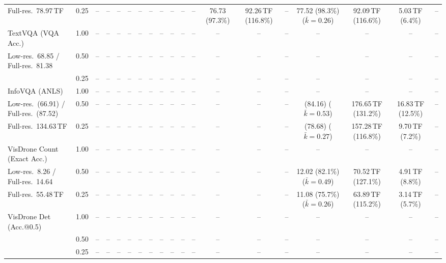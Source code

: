 \begin{table}[t]
{\begin{tabular}{l c | c c c c | c c c c | c c | c c c | c c c c}
{\footnotesize Full-res.\ 78.97\,TF} & 0.25 & -- & -- & -- & -- & -- & -- & -- & -- & -- & -- & 76.73 (97.3\%) & 92.26\,TF (116.8\%) & -- & \cellcolor{gray!15}77.52 (98.3\%) {\footnotesize ($\bar k{=}0.26$)} & 92.09\,TF (116.6\%) & 5.03\,TF (6.4\%) & -- \\
\cmidrule(lr){1-19}
TextVQA (VQA Acc.) & 1.00 & -- & -- & -- & -- & -- & -- & -- & -- & -- & -- & -- & -- & -- & -- & -- & -- & -- \\
{\footnotesize Low-res.\ 68.85 / Full-res.\ 81.38} & 0.50 & -- & -- & -- & -- & -- & -- & -- & -- & -- & -- & -- & -- & -- & -- & -- & -- & -- \\
 & 0.25 & -- & -- & -- & -- & -- & -- & -- & -- & -- & -- & -- & -- & -- & -- & -- & -- & -- \\
\cmidrule(lr){1-19}
InfoVQA (ANLS) & 1.00 & -- & -- & -- & -- & -- & -- & -- & -- & -- & -- & -- & -- & -- & -- & -- & -- & -- \\
{\footnotesize Low-res.\ (66.91) / Full-res.\ (87.52)} & 0.50 & -- & -- & -- & -- & -- & -- & -- & -- & -- & -- & -- & -- & -- & (84.16) {\footnotesize ($\bar k{=}0.53$)} & 176.65\,TF (131.2\%) & 16.83\,TF (12.5\%) & -- \\
{\footnotesize Full-res.\ 134.63\,TF} & 0.25 & -- & -- & -- & -- & -- & -- & -- & -- & -- & -- & -- & -- & -- & (78.68) {\footnotesize ($\bar k{=}0.27$)} & 157.28\,TF (116.8\%) & 9.70\,TF (7.2\%) & -- \\
\cmidrule(lr){1-19}
VisDrone Count (Exact Acc.) & 1.00 & -- & -- & -- & -- & -- & -- & -- & -- & -- & -- & -- & -- & -- & -- & -- & -- & -- \\
{\footnotesize Low-res.\ 8.26 / Full-res.\ 14.64} & 0.50 & -- & -- & -- & -- & -- & -- & -- & -- & -- & -- & -- & -- & -- & 12.02 (82.1\%) {\footnotesize ($\bar k{=}0.49$)} & 70.52\,TF (127.1\%) & 4.91\,TF (8.8\%) & -- \\
{\footnotesize Full-res.\ 55.48\,TF} & 0.25 & -- & -- & -- & -- & -- & -- & -- & -- & -- & -- & -- & -- & -- & 11.08 (75.7\%) {\footnotesize ($\bar k{=}0.26$)} & 63.89\,TF (115.2\%) & 3.14\,TF (5.7\%) & -- \\
\cmidrule(lr){1-19}
VisDrone Det (Acc.@0.5) & 1.00 & -- & -- & -- & -- & -- & -- & -- & -- & -- & -- & -- & -- & -- & -- & -- & -- & -- \\
 & 0.50 & -- & -- & -- & -- & -- & -- & -- & -- & -- & -- & -- & -- & -- & -- & -- & -- & -- \\
 & 0.25 & -- & -- & -- & -- & -- & -- & -- & -- & -- & -- & -- & -- & -- & -- & -- & -- & -- \\

\end{tabular}}
\end{table}
